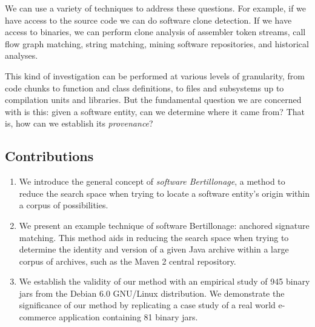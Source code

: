 We can use a variety of techniques to address these questions.  For
example, if we have access to the source code we can do software clone
detection. If we have access to binaries, we can perform clone analysis of
assembler token streams, call flow graph matching, string matching, mining
software repositories, and historical analyses.

This kind of investigation can be performed at various levels of
granularity, from code chunks to function and class definitions, to files
and subsystems up to compilation units and libraries.  But the fundamental
question we are concerned with is this:  given a software entity, can we
determine where it came from?  That is, how can we establish its
\emph{provenance}?

\subsection{Contributions}

\begin{enumerate}
\item We introduce the general concept of \emph{software Bertillonage}, a
    method to reduce the search space when trying to locate a software
    entity's origin within a corpus of possibilities.

\vspace{0.7em}
\item We present an example technique of software Bertillonage: anchored
    signature matching.  This method aids in reducing the search space when
    trying to determine the identity and version of a given Java archive
    within a large
    corpus of archives, such as the Maven 2 central repository.

\vspace{0.7em}
\item We establish the validity of our method with an empirical study
    of 945 binary jars from the Debian 6.0 GNU/Linux distribution.
    We demonstrate the significance of our method by replicating
    a case study
    of a %
    real world e-commerce application containing 81 binary jars.

\end{enumerate}



